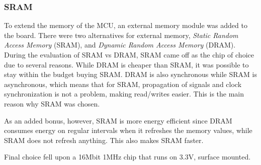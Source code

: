 
\subsubsection{SRAM}

To extend the memory of the MCU, an external memory module was added to the
board. There were two alternatives for external memory, \textit{Static Random Access
Memory} (SRAM), and \textit{Dynamic Random Access Memory} (DRAM). During the evaluation of SRAM
vs DRAM, SRAM came off as the chip of choice due to several reasons. While DRAM
is cheaper than SRAM, it was possible to stay within the budget buying SRAM.
DRAM is also synchronous while SRAM is asynchronous, which means
that for SRAM, propagation of signals and clock synchronization is not a
problem, making read/writes easier. This is the main reason why SRAM was chosen.

As an added bonus, however, SRAM is more energy efficient since DRAM consumes
energy on regular intervals when it refreshes the memory values, while SRAM does
not refresh anything. This also makes SRAM faster.

Final choice fell upon a 16Mbit 1MHz chip that runs on 3.3V, surface mounted.